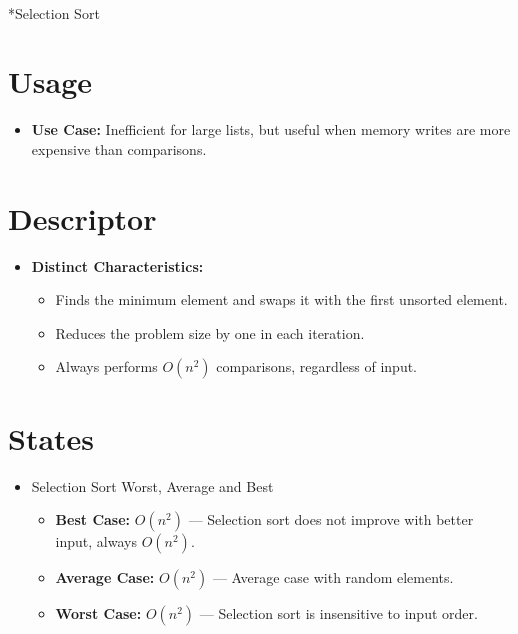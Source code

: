 \documentclass[
  letterpaper,
  DIV=11,
  numbers=noendperiod]{scrreprt}
\makeatletter
\let\oldparagraph\paragraph
\renewcommand{\paragraph}{
    \@ifstar
      \xxxParagraphStar
      \xxxParagraphNoStar
  }
\newcommand{\xxxParagraphStar}[1]{\oldparagraph*{#1}\mbox{}}
\newcommand{\xxxParagraphNoStar}[1]{\oldparagraph{#1}\mbox{}}
\providecommand{\tightlist}{%
  \setlength{\itemsep}{0pt}\setlength{\parskip}{0pt}}
\makeatother
\begin{document}
\paragraph*{Selection Sort}\label{selection-sort}

\section{Usage}

\begin{itemize}
\tightlist
\item
  \textbf{Use Case:} Inefficient for large lists, but useful when memory
  writes are more expensive than comparisons.
\end{itemize}

\section{Descriptor}

\begin{itemize}
\item
  \textbf{Distinct Characteristics:}

  \begin{itemize}
  \tightlist
  \item
    Finds the minimum element and swaps it with the first unsorted
    element.
  \item
    Reduces the problem size by one in each iteration.
  \item
    Always performs \(O(n^2)\) comparisons, regardless of input.
  \end{itemize}
\end{itemize}

\section{States}

\begin{itemize}
\item
  Selection Sort Worst, Average and Best

  \begin{itemize}
  \tightlist
  \item
    \textbf{Best Case:} \(O(n^2)\) --- Selection sort does not improve
    with better input, always \(O(n^2)\).
  \item
    \textbf{Average Case:} \(O(n^2)\) --- Average case with random
    elements.
  \item
    \textbf{Worst Case:} \(O(n^2)\) --- Selection sort is insensitive to
    input order.
  \end{itemize}
\end{itemize}
\end{document}
